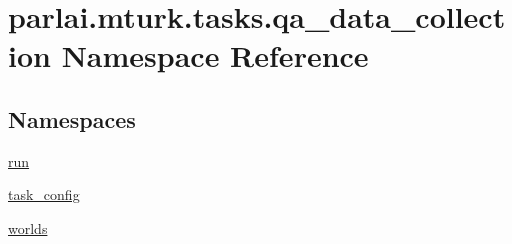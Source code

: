 \hypertarget{namespaceparlai_1_1mturk_1_1tasks_1_1qa__data__collection}{}\section{parlai.\+mturk.\+tasks.\+qa\+\_\+data\+\_\+collection Namespace Reference}
\label{namespaceparlai_1_1mturk_1_1tasks_1_1qa__data__collection}
\subsection*{Namespaces}
\begin{DoxyCompactItemize}
\item 
 \hyperlink{namespaceparlai_1_1mturk_1_1tasks_1_1qa__data__collection_1_1run}{run}
\item 
 \hyperlink{namespaceparlai_1_1mturk_1_1tasks_1_1qa__data__collection_1_1task__config}{task\+\_\+config}
\item 
 \hyperlink{namespaceparlai_1_1mturk_1_1tasks_1_1qa__data__collection_1_1worlds}{worlds}
\end{DoxyCompactItemize}

